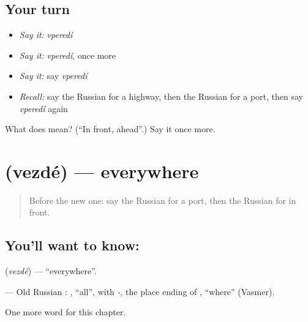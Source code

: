 \subsection*{Your turn}
\begin{itemize}
\raggedright
  \item \emph{Say it:} \emph{vperedí}
  \item \emph{Say it:} \emph{vperedí}, once more
  \item \emph{Say it:} say \emph{vperedí}
  \item \emph{Recall:} say the Russian for a highway, then the Russian for a port, then say \emph{vperedí} again
\end{itemize}

\begin{tcolorbox}[breakable,colback=teal!4,colframe=teal!35!black,title={Before you move on}]
What does  mean? (\textquotedblleft{}In front, ahead\textquotedblright{}.) Say it once more.
\end{tcolorbox}
\section[\texorpdfstring{\ru{везде} (vezdé)}{везде (vezdé)}]{ (vezdé) — everywhere}

\label{lesson:RU-C184-vezde}



\begin{quote}
Before the new one: say the Russian for a port, then the Russian for in front.
\end{quote}

\subsection*{You'll want to know: }
\textbf{} (\emph{vezdé}) — \textquotedblleft{}everywhere\textquotedblright{}.

\begin{cousinweb}
\textbf{} — Old Russian \emph{}: \emph{}, \textquotedblleft{}all\textquotedblright{}, with \emph{-}, the place ending of \emph{}, \textquotedblleft{}where\textquotedblright{} (Vasmer).
\end{cousinweb}

\begin{grammarlens}[title={What you've built}]
One more word for this chapter.
\end{grammarlens}

